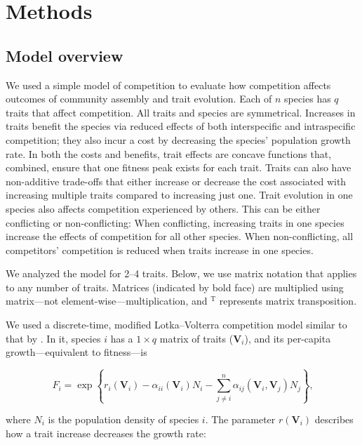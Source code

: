 
\section*{Methods}


\subsection*{Model overview}

We used a simple model of competition to evaluate how competition affects outcomes of
community assembly and trait evolution.
Each of $n$ species has $q$ traits that affect competition.
All traits and species are symmetrical.
Increases in traits benefit the species via reduced
effects of both interspecific and intraspecific competition;
they also incur a cost by decreasing the species' population growth rate.
In both the costs and benefits, trait effects are concave functions that,
combined, ensure that one fitness peak exists for each trait.
Traits can also have non-additive trade-offs that either increase or decrease the cost
associated with increasing multiple traits compared to increasing just one.
Trait evolution in one species also affects competition experienced by others.
This can be either conflicting or non-conflicting:
When conflicting, increasing traits in one species increase the effects of competition
for all other species.
When non-conflicting, all competitors' competition is reduced when traits increase in
one species.

We analyzed the model for 2--4 traits.
Below, we use matrix notation that applies to any number of traits.
Matrices (indicated by bold face) are multiplied using matrix---not
element-wise---multiplication,
and ${}^{\textrm{T}}$ represents matrix transposition.

We used a discrete-time, modified Lotka--Volterra competition model similar to
that by \citet{Northfield:2013if}.
In it, species $i$ has a $1 \times q$ matrix of traits ($\mathbf{V}_i$), and
its per-capita growth---equivalent to fitness---is

\begin{equation} \label{eq:fitness}
    F_{i} = \exp \left\{ r_i(\mathbf{V}_i) - \alpha_{ii}(\mathbf{V}_i) N_i - \sum_{j \ne i}^{n}{
        \alpha_{ij}(\mathbf{V}_i, \mathbf{V}_j) N_j}  \right\}\textrm{,}
\end{equation}

\noindent where $N_i$ is the population density of  species $i$.
The parameter $r(\mathbf{V}_i)$ describes how a trait increase decreases the growth rate:

